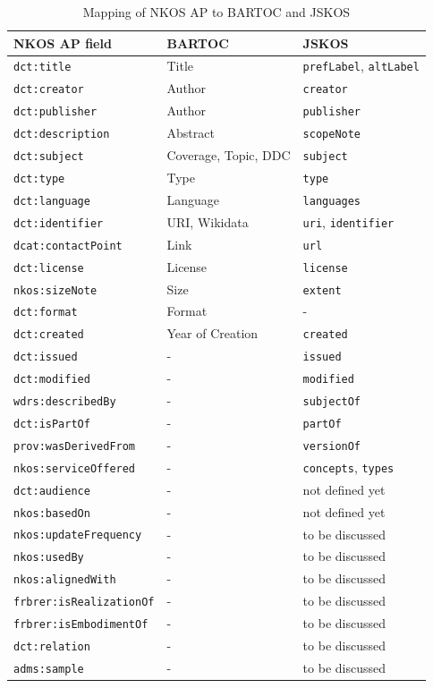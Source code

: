 \documentclass[12pt,a4paper]{llncs}
\begin{document}
\begin{table}\centering
\caption{Mapping of NKOS AP to BARTOC and JSKOS}
\label{tab:nkosap}
\begin{tabular}{lll}
NKOS AP field & BARTOC & JSKOS \\
\hline	
\verb|dct:title| 		& Title  	& \verb|prefLabel|, \verb|altLabel| \\
\verb|dct:creator| 		& Author 	& \verb|creator| \\
\verb|dct:publisher| 	& Author	& \verb|publisher| \\
\verb|dct:description| 	& Abstract  & \verb|scopeNote| \\
\verb|dct:subject| 		& Coverage, Topic, DDC & \verb|subject| \\
\verb|dct:type| 		& Type 		& \verb|type| \\
\verb|dct:language| 	& Language  & \verb|languages| \\
\verb|dct:identifier| 	& URI, Wikidata & \verb|uri|, \verb|identifier| \\
\verb|dcat:contactPoint| & Link     & \verb|url| \\
\verb|dct:license| 		& License 	& \verb|license| \\
\verb|nkos:sizeNote| 	& Size		& \verb|extent| \\
\verb|dct:format| 		& Format	& - \\
\verb|dct:created|		& Year of Creation & \verb|created| \\
\verb|dct:issued| 		& - 		& \verb|issued| \\
\verb|dct:modified|		& - 		& \verb|modified| \\
\verb|wdrs:describedBy| & -         & \verb|subjectOf| \\
\verb|dct:isPartOf| 		& - 	& \verb|partOf| \\
\verb|prov:wasDerivedFrom| & - 		& \verb|versionOf| \\
\verb|nkos:serviceOffered| & - 		& \verb|concepts|, \verb|types| \\
\verb|dct:audience| & - 			& not defined yet \\
\verb|nkos:basedOn| 	& - 		& not defined yet \\
\verb|nkos:updateFrequency| & - 	& to be discussed \\
\verb|nkos:usedBy| & - 				& to be discussed \\
\verb|nkos:alignedWith| 	& -		& to be discussed \\
\verb|frbrer:isRealizationOf| & - 	& to be discussed \\
\verb|frbrer:isEmbodimentOf| & - 	& to be discussed \\
\verb|dct:relation| 		 & - 	& to be discussed \\
\verb|adms:sample| 			 & - 	& to be discussed \\
\hline
\end{tabular}


\end{table}
\end{document}
